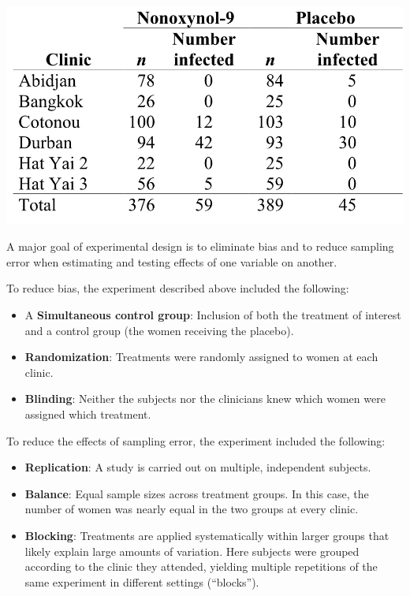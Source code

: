 \documentclass[]{book}
\providecommand{\tightlist}{%
  \setlength{\itemsep}{0pt}\setlength{\parskip}{0pt}}
\begin{document}
\includegraphics[width=12.9in]{images/images_6a.005}

A major goal of experimental design is to eliminate bias and to reduce sampling error when estimating and testing effects of one variable on another.

To reduce bias, the experiment described above included the following:

\begin{itemize}
\tightlist
\item
  A \textbf{Simultaneous control group}: Inclusion of both the treatment of interest and a control group (the women receiving the placebo).
\item
  \textbf{Randomization}: Treatments were randomly assigned to women at each clinic.
\item
  \textbf{Blinding}: Neither the subjects nor the clinicians knew which women were assigned which treatment.
\end{itemize}

To reduce the effects of sampling error, the experiment included the following:

\begin{itemize}
\tightlist
\item
  \textbf{Replication}: A study is carried out on multiple, independent subjects.
\item
  \textbf{Balance}: Equal sample sizes across treatment groups. In this case, the number of women was nearly equal in the two groups at every clinic.
\item
  \textbf{Blocking}: Treatments are applied systematically within larger groups that likely explain large amounts of variation. Here subjects were grouped according to the clinic they attended, yielding multiple repetitions of the same experiment in different settings (``blocks'').
\end{itemize}
\end{document}
